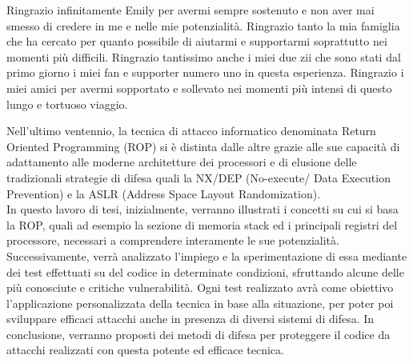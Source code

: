 \documentclass[corpo=11pt,numerazioneromana]{toptesi}
\begin{document}

\frontmatter

\cleardoublepage


\ringraziamenti
Ringrazio infinitamente Emily per avermi sempre sostenuto e non aver mai smesso di credere in me e nelle mie potenzialità. 
Ringrazio tanto la mia famiglia che ha cercato per quanto possibile di aiutarmi e supportarmi soprattutto nei momenti più difficili. Ringrazio tantissimo anche i miei due
zii che sono stati dal primo giorno i miei fan e supporter numero uno in questa esperienza. Ringrazio i miei amici per avermi sopportato e sollevato nei momenti più intensi di questo lungo e tortuoso viaggio. 


\sommario
Nell’ultimo ventennio, la tecnica di attacco informatico denominata Return Oriented Programming (ROP) si è distinta dalle
altre grazie alle sue capacità di adattamento alle moderne architetture dei processori e di elusione delle tradizionali 
strategie di difesa quali la NX/DEP (No-execute/ Data Execution Prevention) e la ASLR (Address Space Layout Randomization).\\  
In questo lavoro di tesi, inizialmente, verranno illustrati i concetti su cui si basa la ROP, quali ad esempio la sezione 
di memoria stack ed i principali registri del processore, necessari a comprendere interamente le sue potenzialità.\\ 
Successivamente, verrà analizzato l’impiego e la sperimentazione di essa mediante dei test effettuati su del codice 
in determinate condizioni, sfruttando alcune delle più conosciute e critiche vulnerabilità. Ogni test realizzato avrà 
come obiettivo l’applicazione personalizzata della tecnica in base alla situazione, per poter poi sviluppare efficaci 
attacchi anche in presenza di diversi sistemi di difesa. In conclusione, verranno proposti dei metodi di difesa per proteggere 
il codice da attacchi realizzati con questa potente ed efficace tecnica.
\end{document}
